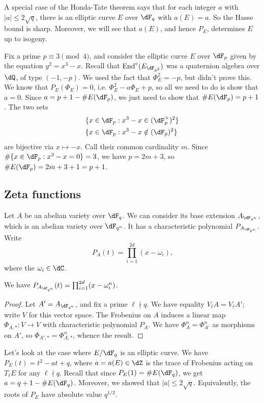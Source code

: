 \documentclass{article}
\begin{document}
A special case of the Honda-Tate theorem says that for each integer $a$ with 
$|a|\leqslant 2\sqrt{q}$, there is an elliptic curve $E$ over $\dF_q$ with 
$a(E)=a$. So the Hasse bound is sharp. Moreover, we will see that $a(E)$, and 
hence $P_E$, determines $E$ up to isogeny. 

\begin{example}
Fix a prime $p\equiv 3\pmod 4$, and consider the elliptic curve $E$ over 
$\dF_p$ given by the equation $y^2=x^3-x$. Recall that 
$\End^\circ(E_{\dF_{p^2}})$ was a quaternion algebra over $\dQ$, of type 
$(-1,-p)$. We used the fact that $\Phi_E^2=-p$, but didn't prove this. We 
know that $P_E(\Phi_E)=0$, i.e. $\Phi_E^2-a \Phi_E+p$, so all we need to do 
is show that $a=0$. Since $a=p+1-\# E(\dF_p)$, we just need to show that 
$\# E(\dF_p)=p+1$. The two sets 
\begin{align*}
  \{x\in \dF_p &: x^3-x\in (\dF_p^\times)^2\} \\
  \{x\in \dF_p &: x^3-x\notin (\dF_p)^2\}
\end{align*}
are bijective via $x\mapsto -x$. Call their common cardinality $m$. 
Since $\#\{x\in \dF_p:x^3-x=0\} = 3$, we have $p=2 m+3$, so 
$\# E(\dF_p)=2 m+3+1=p+1$. 
\end{example}


\subsection*{Zeta functions}

Let $A$ be an abelian variety over $\dF_q$. We can consider its base extension 
$A_{\dF_{q^n}}$, which is an abelian variety over $\dF_{q^n}$. It has a 
characteristic polynomial $P_{A_{\dF_{p^n}}}$. Write 
\[
  P_A(t) = \prod_{i=1}^{2 d} (x-\omega_i) \text{,}
\]
where the $\omega_i\in \dC$. 

\begin{theorem}\label{thm:char-poly-power}
We have $P_{A_{\dF_{q^n}}}(t) = \prod_{i=1}^{2 d} (x-\omega_i^n)$. 
\end{theorem}
\begin{proof}
Let $A'=A_{\dF_{q^n}}$, and fix a prime $\ell\nmid q$. We have equality 
$V_\ell A = V_\ell A'$; write $V$ for this vector space. The Frobenius 
on $A$ induces a linear map $\Phi_{A,\ast}:V\to V$ with characteristic 
polynomial $P_A$. We have $\Phi_A^n=\Phi_{A'}^n$ as morphisms on $A'$, so 
$\Phi_{A',\ast} = \Phi_{A,\ast}^n$, whence the result. 
\end{proof}

Let's look at the case where $E/\dF_q$ is an elliptic curve. We have 
$P_E(t)=t^2-a t+q$, where $a=a(E)\in \dZ$ is the trace of Frobenius acting on 
$T_\ell E$ for any $\ell\nmid q$. Recall that since $P_E(1)=\# E(\dF_q)$, we 
get $a=q+1-\# E(\dF_q)$. Moreover, we showed that $|a|\leqslant 2\sqrt q$. 
Equivalently, the roots of $P_E$ have absolute value $q^{1/2}$. 
\end{document}
